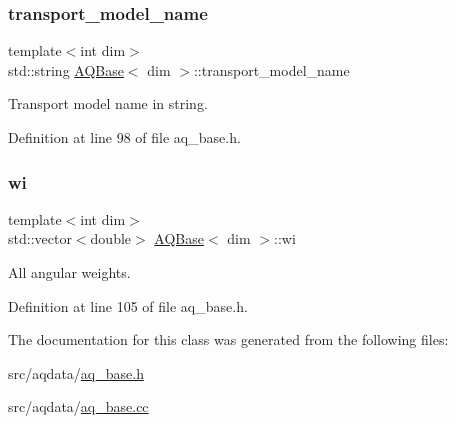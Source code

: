 \subsubsection{\texorpdfstring{transport\+\_\+model\+\_\+name}{transport\_model\_name}}
{\footnotesize\ttfamily template$<$int dim$>$ \\
std\+::string \hyperlink{class_a_q_base}{A\+Q\+Base}$<$ dim $>$\+::transport\+\_\+model\+\_\+name\hspace{0.3cm}{\ttfamily [protected]}}



Transport model name in string. 



Definition at line 98 of file aq\+\_\+base.\+h.

\mbox{\label{class_a_q_base_aa43b0232837b86e608da7507bd9a14b5}} 
\subsubsection{\texorpdfstring{wi}{wi}}
{\footnotesize\ttfamily template$<$int dim$>$ \\
std\+::vector$<$double$>$ \hyperlink{class_a_q_base}{A\+Q\+Base}$<$ dim $>$\+::wi\hspace{0.3cm}{\ttfamily [protected]}}



All angular weights. 



Definition at line 105 of file aq\+\_\+base.\+h.



The documentation for this class was generated from the following files\+:\begin{DoxyCompactItemize}
\item 
src/aqdata/\hyperlink{aq__base_8h}{aq\+\_\+base.\+h}\item 
src/aqdata/\hyperlink{aq__base_8cc}{aq\+\_\+base.\+cc}\end{DoxyCompactItemize}
